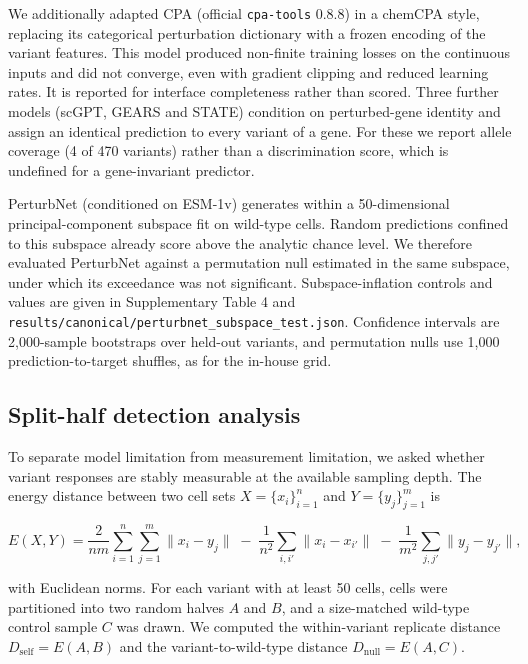 \documentclass[11pt,letterpaper]{article}
\begin{document}
We additionally adapted CPA\cite{CPA2023} (official \texttt{cpa-tools} 0.8.8) in a chemCPA style, replacing its categorical perturbation dictionary with a frozen encoding of the variant features. This model produced non-finite training losses on the continuous inputs and did not converge, even with gradient clipping and reduced learning rates. It is reported for interface completeness rather than scored. Three further models (scGPT\cite{scGPT}, GEARS\cite{GEARS} and STATE\cite{STATE}) condition on perturbed-gene identity and assign an identical prediction to every variant of a gene. For these we report allele coverage (4 of 470 variants) rather than a discrimination score, which is undefined for a gene-invariant predictor.

PerturbNet\cite{PerturbNet} (conditioned on ESM-1v) generates within a 50-dimensional principal-component subspace fit on wild-type cells. Random predictions confined to this subspace already score above the analytic chance level. We therefore evaluated PerturbNet against a permutation null estimated in the same subspace, under which its exceedance was not significant. Subspace-inflation controls and values are given in Supplementary Table 4 and \texttt{results/canonical/perturbnet\_subspace\_test.json}. Confidence intervals are 2,000-sample bootstraps over held-out variants, and permutation nulls use 1,000 prediction-to-target shuffles, as for the in-house grid.

\subsection*{Split-half detection analysis}

To separate model limitation from measurement limitation, we asked whether variant responses are stably measurable at the available sampling depth. The energy distance between two cell sets $X = \{x_i\}_{i=1}^{n}$ and $Y = \{y_j\}_{j=1}^{m}$ is

\[
E(X, Y) = \frac{2}{nm}\sum_{i=1}^{n}\sum_{j=1}^{m}\lVert x_i - y_j\rVert \;-\; \frac{1}{n^2}\sum_{i,i'}\lVert x_i - x_{i'}\rVert \;-\; \frac{1}{m^2}\sum_{j,j'}\lVert y_j - y_{j'}\rVert,
\]

with Euclidean norms. For each variant with at least 50 cells, cells were partitioned into two random halves $A$ and $B$, and a size-matched wild-type control sample $C$ was drawn. We computed the within-variant replicate distance $D_{\mathrm{self}} = E(A, B)$ and the variant-to-wild-type distance $D_{\mathrm{null}} = E(A, C)$.
\end{document}
